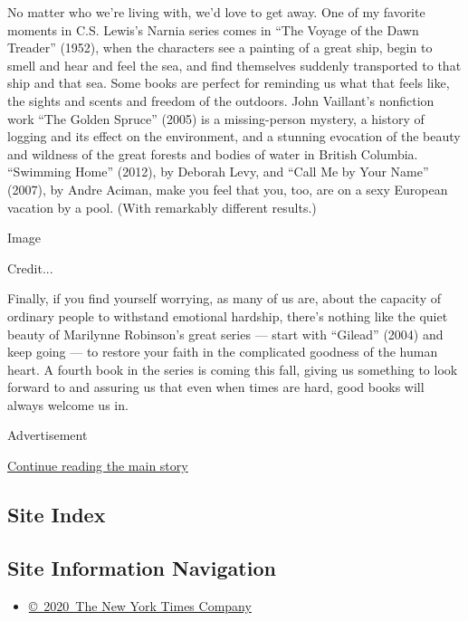 No matter who we're living with, we'd love to get away. One of my
favorite moments in C.S. Lewis's Narnia series comes in ``The Voyage of
the Dawn Treader'' (1952), when the characters see a painting of a great
ship, begin to smell and hear and feel the sea, and find themselves
suddenly transported to that ship and that sea. Some books are perfect
for reminding us what that feels like, the sights and scents and freedom
of the outdoors. John Vaillant's nonfiction work ``The Golden Spruce''
(2005) is a missing-person mystery, a history of logging and its effect
on the environment, and a stunning evocation of the beauty and wildness
of the great forests and bodies of water in British Columbia. ``Swimming
Home'' (2012), by Deborah Levy, and ``Call Me by Your Name'' (2007), by
Andre Aciman, make you feel that you, too, are on a sexy European
vacation by a pool. (With remarkably different results.)

Image

Credit...

Finally, if you find yourself worrying, as many of us are, about the
capacity of ordinary people to withstand emotional hardship, there's
nothing like the quiet beauty of Marilynne Robinson's great series ---
start with ``Gilead'' (2004) and keep going --- to restore your faith in
the complicated goodness of the human heart. A fourth book in the series
is coming this fall, giving us something to look forward to and assuring
us that even when times are hard, good books will always welcome us in.

Advertisement

\protect\hyperlink{after-bottom}{Continue reading the main story}

\hypertarget{site-index}{%
\subsection{Site Index}\label{site-index}}

\hypertarget{site-information-navigation}{%
\subsection{Site Information
Navigation}\label{site-information-navigation}}

\begin{itemize}
\tightlist
\item
  \href{https://help.nytimes.com/hc/en-us/articles/115014792127-Copyright-notice}{©~2020~The
  New York Times Company}
\end{itemize}

